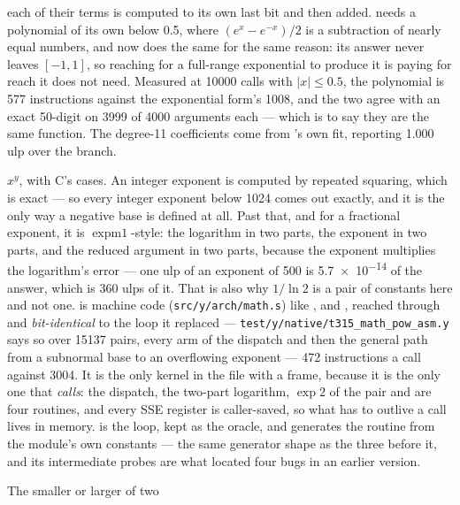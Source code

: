 \begin{description}[style=nextline,leftmargin=5.2em]
    each of their terms is computed to its own last bit and then added.
     needs a polynomial of its own below \num{0.5}, where $(e^x-e^{-x})/2$
    is a subtraction of nearly equal numbers, and  now does the same for
    the same reason: its answer never leaves $[-1, 1]$, so reaching for a
    full-range exponential to produce it is paying for reach it does not need.
    Measured at \num{10000} calls with $|x| \leq \num{0.5}$, the polynomial is
    \num{577} instructions against the exponential form's \num{1008}, and the two
    agree with an exact \num{50}-digit  on \num{3999} of \num{4000}
    arguments each --- which is to say they are the same function. The degree-11
    coefficients come from 's own fit, reporting
    \num{1.000} ulp over the branch.
  \item[\ic{math.pow(x, y)}] $x^y$, with C's cases. An integer exponent is
    computed by repeated squaring, which is exact --- so every integer exponent
    below \num{1024} comes out exactly, and it is the only way a negative base
    is defined at all. Past that, and for a fractional exponent, it is
    $\operatorname{expm1}$-style: the logarithm in two parts, the exponent in two parts, and
    the reduced argument in two parts, because the exponent multiplies the
    logarithm's error --- one ulp of an exponent of \num{500} is
    \num{5.7e-14} of the answer, which is 360 ulps of it. That is also why $1/\ln 2$
    is a pair of constants here and not one.  is machine code
    (\texttt{src/y/arch/math.s}) like ,  and , reached
    through  and \emph{bit-identical} to the loop it replaced ---
    \texttt{test/y/native/t315\_math\_pow\_asm.y} says so over \num{15137}
    pairs, every arm of the dispatch and then the general path from a subnormal
    base to an overflowing exponent --- \num{472} instructions a call against
    \num{3004}. It is the only kernel in the file with a frame, because it is the
    only one that \emph{calls}: the dispatch, the two-part logarithm, $\exp 2$ of
    the pair and  are four routines, and every SSE register is
    caller-saved, so what has to outlive a call lives in memory.  is the
    loop, kept as the oracle, and  generates the
    routine from the module's own constants --- the same generator shape as the
    three before it, and its intermediate probes are what located four bugs in an
    earlier version.
\item[\ic{math.min(a, b)}, \ic{math.max(a, b)}] The smaller or larger of two

\end{description}
